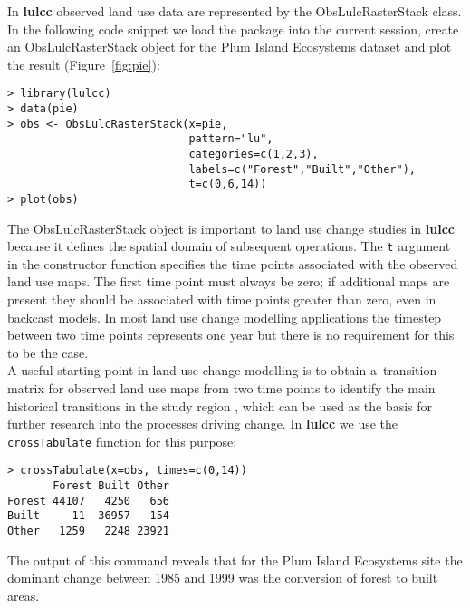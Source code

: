 \documentclass[gmdd, online, hvmath]{copernicus}
\begin{document}
In \textbf{lulcc} observed land use data are represented by the ObsLulcRasterStack class. In the following code snippet we load the package into the current session, create an ObsLulcRasterStack object for the Plum Island Ecosystems dataset and plot the result (Figure~\ref{fig:pie}):
\begin{verbatim}
> library(lulcc)
> data(pie)
> obs <- ObsLulcRasterStack(x=pie,
                            pattern="lu",
                            categories=c(1,2,3),
                            labels=c("Forest","Built","Other"),
                            t=c(0,6,14))
> plot(obs)
\end{verbatim} 

\noindent The ObsLulcRasterStack object is important to land use change studies in \textbf{lulcc} because it defines the spatial domain of subsequent operations. The \texttt{t} argument in the constructor function specifies the time points associated with the observed land use maps. The first time point must always be zero; if additional maps are present they should be associated with time points greater than zero, even in backcast models. In most land use change modelling applications the timestep between two time points represents one year but there is no requirement for this to be the case. \\

A useful starting point in land use change modelling is to obtain a~transition matrix for observed land use maps from two time points to identify the main historical transitions in the study region \citep{pontius2004}, which can be used as the basis for further research into the processes driving change. In \textbf{lulcc} we use the \texttt{crossTabulate} function for this purpose:
\begin{verbatim}
> crossTabulate(x=obs, times=c(0,14)) 
       Forest Built Other
Forest 44107   4250   656
Built     11  36957   154 
Other   1259   2248 23921
\end{verbatim}\hack{\noindent}\noindent The output of this command reveals that for the Plum Island Ecosystems site the dominant change between 1985 and 1999 was the conversion of forest to built areas. \\
\end{document}
